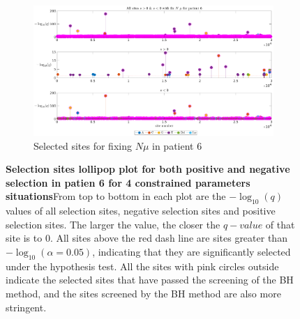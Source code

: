 \documentclass[12pt]{article}
\begin{document}
\begin{figure}[H]
    \ContinuedFloat

    
    \begin{subfigure}{0.7\textwidth}
    
    
        \hspace{-2.5cm}
            \includegraphics[height=0.45\textheight]{figures/patient/pt6/pt6_siteunder_selection_all_fixNmu.eps}
        
        \caption{Selected sites for fixing $N \mu$ in patient 6}
        \label{fig:subfig4}
    \end{subfigure}
    
    \caption{\textbf{Selection sites lollipop plot for both positive and negative selection in patien 6 for 4 constrained parameters situations}From top to bottom in each plot are the $-\log_{10}(q)$ values of all selection sites, negative selection sites and positive selection sites. The larger the value, the closer the $q-value$ of that site is to 0. All sites above the red dash line are sites greater than $-\log_{10}(\alpha=0.05)$, indicating that they are significantly selected under the hypothesis test. All the sites with pink circles outside indicate the selected sites that have passed the screening of the BH method, and the sites screened by the BH method are also more stringent.}
    \label{fig:four_subfigs}
\end{figure}
\end{document}
